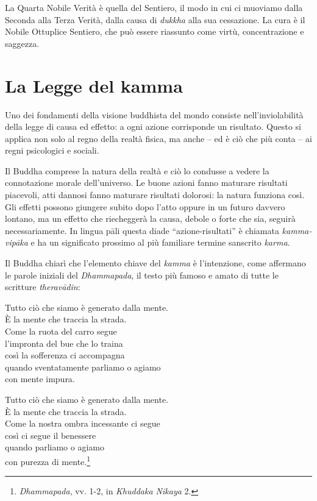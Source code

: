 La Quarta Nobile Verità è quella del Sentiero, il modo in cui ci
muoviamo dalla Seconda alla Terza Verità, dalla causa di \emph{dukkha}
alla sua cessazione. La cura è il Nobile Ottuplice Sentiero, che può
essere riassunto come virtù, concentrazione e saggezza.

\section{La Legge del kamma}

Uno dei fondamenti della visione buddhista del mondo consiste
nell'inviolabilità della legge di causa ed effetto: a ogni azione
corrisponde un risultato. Questo si applica non solo al regno della
realtà fisica, ma anche -- ed è ciò che più conta -- ai regni
psicologici e sociali.

Il Buddha comprese la natura della realtà e ciò lo condusse a vedere la
connotazione morale dell'universo. Le buone azioni fanno maturare
risultati piacevoli, atti dannosi fanno maturare risultati dolorosi: la
natura funziona così. Gli effetti possono giungere subito dopo l'atto
oppure in un futuro davvero lontano, ma un effetto che riecheggerà la
causa, debole o forte che sia, seguirà necessariamente. In lingua pāli
questa diade ``azione-risultati'' è chiamata \emph{kamma-vipāka} e ha un
significato prossimo al più familiare termine sanscrito \emph{karma}.

Il Buddha chiarì che l'elemento chiave del \emph{kamma} è l'intenzione,
come affermano le parole iniziali del \emph{Dhammapada}, il testo più
famoso e amato di tutte le scritture \emph{theravādin}:

Tutto ciò che siamo è generato dalla mente.\\
È la mente che traccia la strada.\\
Come la ruota del carro segue\\
l'impronta del bue che lo traina\\
così la sofferenza ci accompagna\\
quando sventatamente parliamo o agiamo\\
con mente impura.

Tutto ciò che siamo è generato dalla mente.\\
È la mente che traccia la strada.\\
Come la nostra ombra incessante ci segue\\
così ci segue il benessere\\
quando parliamo o agiamo\\
con purezza di mente.\footnote{\emph{Dhammapada}, vv. 1-2, in
  \emph{Khuddaka Nikaya} 2.}

